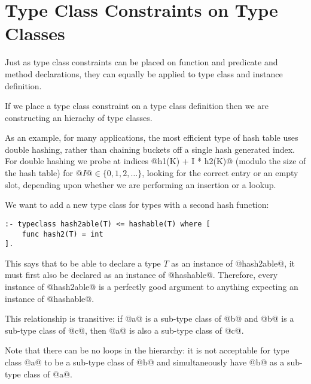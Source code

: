 \section{Type Class Constraints on Type Classes}

Just as type class constraints can be placed on function and predicate
and method declarations, they can equally be applied to type class and 
instance definition.

If we place a type class constraint on a type class definition then we
are constructing an hierachy of type classes.

As an example, for many applications, the most efficient type of hash
table uses double hashing, rather than chaining buckets off a single
hash generated index.  For double hashing we probe at indices
@h1(K) + I * h2(K)@ (modulo the size of the hash table) for
$@I@ \in \{0, 1, 2, \ldots\}$, looking for the correct entry or an empty
slot, depending upon whether we are performing an insertion or a lookup.

We want to add a new type class for types with a second hash function:
\begin{verbatim}
:- typeclass hash2able(T) <= hashable(T) where [
    func hash2(T) = int
].
\end{verbatim}
This says that to be able to declare a type $T$ as an instance of
@hash2able@, it must first also be declared as an instance of
@hashable@.  Therefore, every instance of @hash2able@ is a
perfectly good argument to anything expecting an instance of @hashable@.

This relationship is transitive: if @a@ is a sub-type class of @b@ and
@b@ is a sub-type class of @c@, then @a@ is also a sub-type class of
@c@.

Note that there can be no loops in the hierarchy: it is not acceptable
for type class @a@ to be a sub-type class of @b@ and simultaneously have
@b@ as a sub-type class of @a@.

